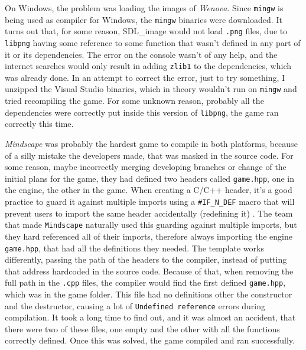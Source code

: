 On Windows, the problem was loading the images of \textit{Wenova}. Since \texttt{mingw} is being used as compiler for Windows, the \texttt{mingw} binaries were downloaded. It turns out that, for some reason, SDL\_image would not load \texttt{.png} files, due to \texttt{libpng} having some reference to some function that wasn't defined in any part of it or its dependencies. The error on the console wasn't of any help, and the internet searches would only result in adding \texttt{zlib1} to the dependencies, which was already done. In an attempt to correct the error, just to try something, I unzipped the Visual Studio binaries, which in theory wouldn't run on \texttt{mingw} and tried recompiling the game. For some unknown reason, probably all the dependencies were correctly put inside this version of \texttt{libpng}, the game ran correctly this time.

\textit{Mindscape} was probably the hardest game to compile in both platforms, because of a silly mistake the developers made, that was masked in the source code. For some reason, maybe incorrectly merging developing branches or change of the initial plans for the game, they had defined two headers called \texttt{game.hpp}, one in the engine, the other in the game. When creating a C/C++ header, it's a good practice to guard it against multiple imports using a \texttt{\#IF\_N\_DEF} macro that will prevent users to import the same header accidentally (redefining it) \cite{disch_2009}. The team that made \texttt{Mindscape} naturally used this guarding against multiple imports, but they hard referenced all of their imports, therefore always importing the engine \texttt{game.hpp}, that had all the definitions they needed. The template works differently, passing the path of the headers to the compiler, instead of putting that address hardcoded in the source code. Because of that, when removing the full path in the \texttt{.cpp} files, the compiler would find the first defined \texttt{game.hpp}, which was in the game folder. This file had no definitions other the constructor and the destructor, causing a lot of \texttt{Undefined reference} errors during compilation. It took a long time to find out, and it was almost an accident, that there were two of these files, one empty and the other with all the functions correctly defined. Once this was solved, the game compiled and ran successfully.



